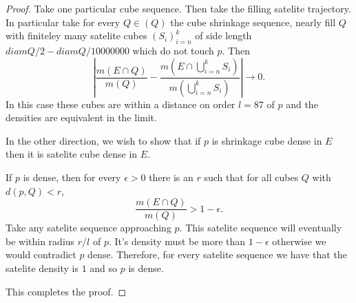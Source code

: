 \documentclass[letter]{article}
\newenvironment{menumerate}{%
  \edef\backupindent{\the\parindent}%
  \enumerate%
  \setlength{\parindent}{\backupindent}%
}{\endenumerate}
\begin{document}
\begin{menumerate}
\begin{proof}
		Take one particular cube sequence. Then take the filling satelite trajectory. In particular take for every $Q \in (Q)$ the cube shrinkage sequence, nearly fill $Q$ with finiteley many satelite cubes $(S_i)_{i=n}^{k}$ of side length $diam Q/2 - diam Q/10000000$ which do not touch $p$. Then
		\begin{equation}
		\left|\frac{m(E \cap Q)}{m(Q)} - \frac{m(E \cap \bigcup_{i=n}^k S_i)}{m\left(\bigcup_{i=n}^k S_i\right)}\right| \to 0.
		\end{equation}
		In this case these cubes are within a distance on order $l = 87$ of $p$ and the densities are equivalent in the limit. 

		In the other direction, we wish to show that if $p$ is shrinkage cube dense in $E$ then it is satelite cube dense in $E$.

		If $p$ is dense, then for every $\epsilon >0$ there is an $r$ such that for all cubes $Q$ with $d(p,Q) < r$,
		\begin{equation}
			\frac{m(E \cap Q)}{m(Q)} > 1- \epsilon.
		\end{equation}
		Take any satelite sequence approaching $p$. This satelite sequence will eventually be within radius $r/l$ of $p$. It's density must be more than $1 - \epsilon$
		otherwise we would contradict $p$ dense.
		Therefore, for every satelite sequence we have that the satelite density is $1$ and so $p$ is dense. 

		This completes the proof.
	\end{proof}


\end{menumerate}
\end{document}
